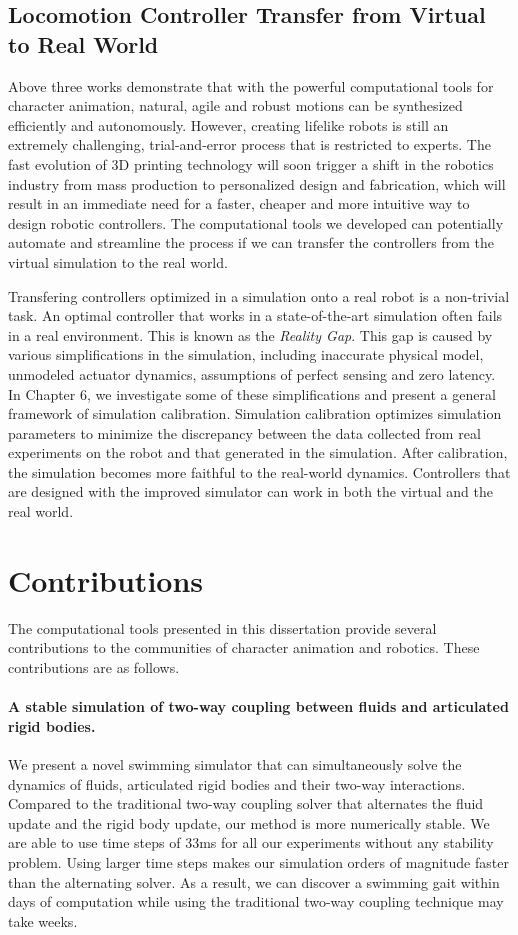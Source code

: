 \subsection{Locomotion Controller Transfer from Virtual to Real World}

Above three works demonstrate that with the powerful computational tools for character animation, natural, agile and robust motions can be synthesized efficiently and autonomously. However, creating lifelike robots is still an extremely challenging, trial-and-error process that is restricted to experts. The fast evolution of 3D printing technology will soon trigger a shift in the robotics industry from mass production to personalized design and fabrication, which will result in an immediate need for a faster, cheaper and more intuitive way to design robotic controllers. The computational tools we developed can potentially automate and streamline the process if we can transfer the controllers from the virtual simulation to the real world.

Transfering controllers optimized in a simulation onto a real robot is a non-trivial task. An optimal controller that works in a state-of-the-art simulation often fails in a real environment. This is known as the \emph{Reality Gap}. This gap is caused by various simplifications in the simulation, including inaccurate physical model, unmodeled actuator dynamics, assumptions of perfect sensing and zero latency. In Chapter 6, we investigate some of these simplifications and present a general framework of simulation calibration. Simulation calibration optimizes simulation parameters to minimize the discrepancy between the data collected from real experiments on the robot and that generated in the simulation. After calibration, the simulation becomes more faithful to the real-world dynamics. Controllers that are designed with the improved simulator can work in both the virtual and the real world. 

\section{Contributions}

The computational tools presented in this dissertation provide several contributions to the communities of character animation and robotics. These contributions are as follows.

\paragraph{A stable simulation of two-way coupling between fluids and articulated rigid bodies.} We present a novel swimming simulator that can simultaneously solve the dynamics of fluids, articulated rigid bodies and their two-way interactions. Compared to the traditional two-way coupling solver that alternates the fluid update and the rigid body update, our method is more numerically stable. We are able to use time steps of 33ms for all our experiments without any stability problem. Using larger time steps makes our simulation orders of magnitude faster than the alternating solver. As a result, we can discover a swimming gait within days of computation while using the traditional two-way coupling technique may take weeks.


